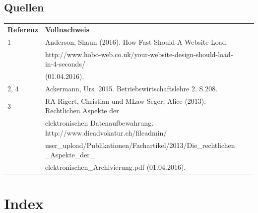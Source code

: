 \documentclass[a4paper]{scrreprt}
\begin{document}
\section{Quellen}
\begin{table}[h]
\label{tab_quellen}
\begin{tabular}{llll}
{\textbf{Referenz}} & {\textbf{Vollnachweis}} 							\\
1 		&  Anderson, Shaun (2016). How Fast Should A Website Load. \\
		& http://www.hobo-web.co.uk/your-website-design-should-load-in-4-seconds/ \\
		& (01.04.2016). \\
		
2, 4 	&  Ackermann, Urs. 2015. Betriebswirtschaftslehre 2. S.208.\\

3 		& RA Rigert, Christian und MLaw Seger, Alice (2013). Rechtlichen Aspekte der \\
		& elektronischen Datenaufbewahrung. http://www.dieadvokatur.ch/fileadmin/ \\
		& user\_upload/Publikationen/Fachartikel/2013/Die\_rechtlichen \_Aspekte\_der\_ \\
		& elektronischen\_Archivierung.pdf (01.04.2016).\\

\end{tabular}
\end{table}

\chapter{Index}
\end{document}
